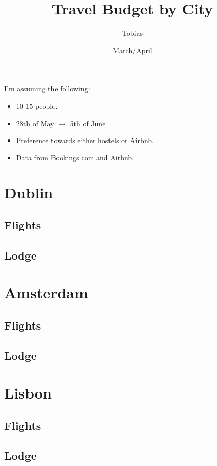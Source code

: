 \documentclass[12pt]{article}
\title{Travel Budget by City}
\author{Tobias}
\date{March/April}
\begin{document}
	\maketitle
	I'm assuming the following:
	\begin{itemize}
		\item 10-15 people.
		\item 28th of May $\rightarrow$ 5th of June
		\item Preference towards either hostels or Airbnb.
		\item Data from Bookings.com and Airbnb.
	\end{itemize}
	
	\section{Dublin}
	\subsection{Flights}
	
	\subsection{Lodge}
	
	\section{Amsterdam}
	
	\subsection{Flights}
	
	\subsection{Lodge}
	
	\section{Lisbon}
	
	\subsection{Flights}
	
	\subsection{Lodge}
\end{document}
